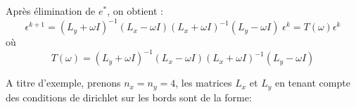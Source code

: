 \documentclass{article}
\begin{document}
Après élimination de $e^{*}$, on obtient :
\begin{equation}
 \epsilon^{k+1} = (L_y+\omega I)^{-1}  (L_x-\omega I)  (L_x+\omega I)^{-1} (L_y-\omega I) \; \epsilon^k = T(\omega) \epsilon^k
 \label{err}
\end{equation}
où
\begin{equation}
T(\omega) = (L_y+\omega I)^{-1} (L_x-\omega I)   (L_x+\omega I)^{-1} (L_y-\omega I)
 \label{Tk}
\end{equation}

A titre d'exemple,  prenons $n_x=n_y=4$, les matrices $L_x$ et $L_y$
en tenant compte des conditions de dirichlet sur les bords sont de la forme:

\begin{center}
 \end{center}
\end{document}
